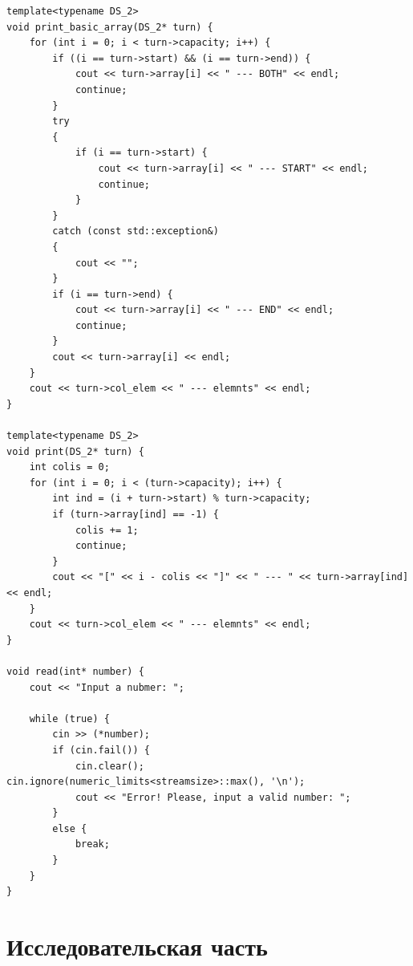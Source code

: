 \documentclass[14pt]{article}
\begin{document}
\begin{lstlisting}[label = list1, caption = Программная реализация]
template<typename DS_2>
void print_basic_array(DS_2* turn) {
	for (int i = 0; i < turn->capacity; i++) {
		if ((i == turn->start) && (i == turn->end)) {
			cout << turn->array[i] << " --- BOTH" << endl;
			continue;
		}
		try
		{
			if (i == turn->start) {
				cout << turn->array[i] << " --- START" << endl;
				continue;
			}
		}
		catch (const std::exception&)
		{
			cout << "";
		}
		if (i == turn->end) {
			cout << turn->array[i] << " --- END" << endl;
			continue;
		}
		cout << turn->array[i] << endl;
	}
	cout << turn->col_elem << " --- elemnts" << endl;
}

template<typename DS_2>
void print(DS_2* turn) {
	int colis = 0;
	for (int i = 0; i < (turn->capacity); i++) {
		int ind = (i + turn->start) % turn->capacity;
		if (turn->array[ind] == -1) {
			colis += 1;
			continue;
		}
		cout << "[" << i - colis << "]" << " --- " << turn->array[ind] << endl;   
	}
	cout << turn->col_elem << " --- elemnts" << endl;
}

void read(int* number) {
	cout << "Input a nubmer: ";
	
	while (true) {
		cin >> (*number);
		if (cin.fail()) {
			cin.clear(); 				cin.ignore(numeric_limits<streamsize>::max(), '\n'); 
			cout << "Error! Please, input a valid number: ";
		}
		else {
			break; 
		}
	}
}
\end{lstlisting}
	
	\section{Исследовательская часть}
\end{document}
